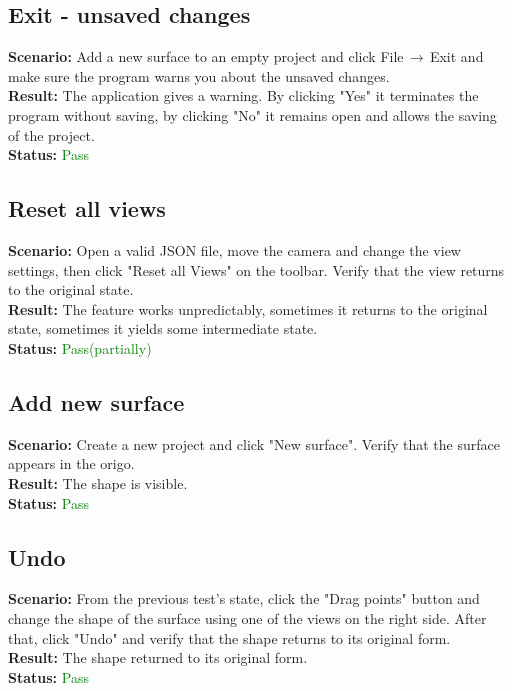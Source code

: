 \documentclass[a4paper, 11pt, article]{report}
\begin{document}
\subsection{Exit - unsaved changes}

\noindent \textbf{Scenario:} Add a new surface to an empty project and click File$\,\to\,$Exit and make sure the program warns you about the unsaved changes.
\\
\noindent \textbf{Result:} The application gives a warning. By clicking "Yes" it terminates the program without saving, by clicking "No" it remains open and allows the saving of the project.
\\
\noindent \textbf{Status:} \textcolor{green}{Pass}

\subsection{Reset all views}

\noindent \textbf{Scenario:} Open a valid JSON file, move the camera and change the view settings, then click "Reset all Views" on the toolbar. Verify that the view returns to the original state.
\\
\noindent \textbf{Result:} The feature works unpredictably, sometimes it returns to the original state, sometimes it yields some intermediate state.
\\
\noindent \textbf{Status:} \textcolor{green}{Pass(partially)}

\subsection{Add new surface}

\noindent \textbf{Scenario:} Create a new project and click "New surface". Verify that the surface appears in the origo.
\\
\noindent \textbf{Result:} The shape is visible.
\\
\noindent \textbf{Status:} \textcolor{green}{Pass}

\subsection{Undo}

\noindent \textbf{Scenario:} From the previous test's state, click the "Drag points" button and change the shape of the surface using one of the views on the right side. After that, click "Undo" and verify that the shape returns to its original form.
\\
\noindent \textbf{Result:} The shape returned to its original form.
\\
\noindent \textbf{Status:} \textcolor{green}{Pass}
\end{document}
